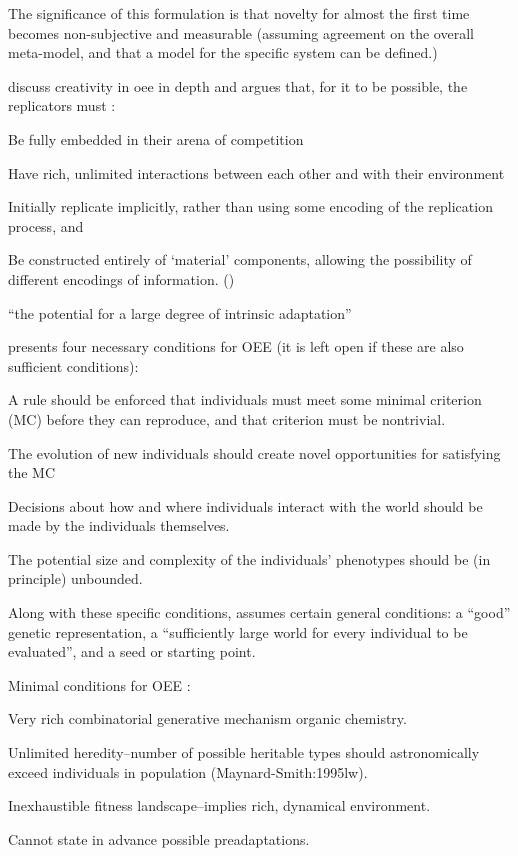 The significance of this formulation is that novelty for almost the first time becomes non-subjective and measurable (assuming agreement on the overall meta-model, and that a model for the specific system can be defined.)

\Textcite{Taylor2001,Taylor:1999sc} discuss creativity in \gls{oee} in depth and argues that, for it to be possible, the replicators must \parencite{Hutton2004}:
\begin{compactenum}
	\item Be fully embedded in their arena of competition 
	\item Have rich, unlimited interactions between each other and with their environment 
	\item Initially replicate implicitly, rather than using some encoding of the replication process, and 
	\item Be constructed entirely of `material' components, allowing the possibility of different encodings of information. ()
\end{compactenum}

``the potential for a large degree of intrinsic adaptation'' \parencite{Taylor2001}

\parencite{Soros2014} presents four necessary conditions for OEE (it is left open if these are also sufficient conditions):
\begin{compactenum}
	\item A rule should be enforced that individuals must meet some minimal criterion (MC) before they can reproduce, and that criterion must be nontrivial.
	\item The evolution of new individuals should create novel opportunities for satisfying the MC
	\item Decisions about how and where individuals interact with the world should be made by the individuals themselves.
	\item The potential size and complexity of the individuals' phenotypes should be (in principle) unbounded.
\end{compactenum}
Along with these specific conditions, \parencite{Soros2014} assumes certain general conditions: a ``good'' genetic representation, a ``sufficiently large world for every individual to be evaluated'', and a seed or starting point.

Minimal conditions for OEE \parencite{Vasas2015}:
\begin{compactenum}
	\item Very rich combinatorial generative mechanism \eg organic chemistry.
	\item Unlimited heredity--number of possible heritable types should astronomically exceed individuals in population (Maynard-Smith:1995lw).
	\item Inexhaustible fitness landscape--implies rich, dynamical environment.
	\item Cannot state in advance possible preadaptations.
\end{compactenum}

